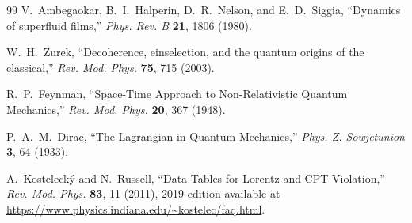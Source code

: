 ﻿\documentclass[twocolumn,showpacs,preprintnumbers,amsmath,amssymb,prd]{revtex4-2}
\begin{document}
\begin{thebibliography}{99}
V.~Ambegaokar, B.~I.~Halperin, D.~R.~Nelson, and E.~D.~Siggia,
``Dynamics of superfluid films,''
\emph{Phys. Rev. B} \textbf{21}, 1806 (1980).

W.~H.~Zurek,
``Decoherence, einselection, and the quantum origins of the classical,''
\emph{Rev. Mod. Phys.} \textbf{75}, 715 (2003).

R.~P.~Feynman,
``Space-Time Approach to Non-Relativistic Quantum Mechanics,''
\emph{Rev. Mod. Phys.} \textbf{20}, 367 (1948).

P.~A.~M.~Dirac,
``The Lagrangian in Quantum Mechanics,''
\emph{Phys. Z. Sowjetunion} \textbf{3}, 64 (1933).

A.~Kostelecký and N.~Russell,
``Data Tables for Lorentz and CPT Violation,''
\emph{Rev. Mod. Phys.} \textbf{83}, 11 (2011), 
2019 edition available at \url{https://www.physics.indiana.edu/~kostelec/faq.html}.

\end{thebibliography}
\end{document}
